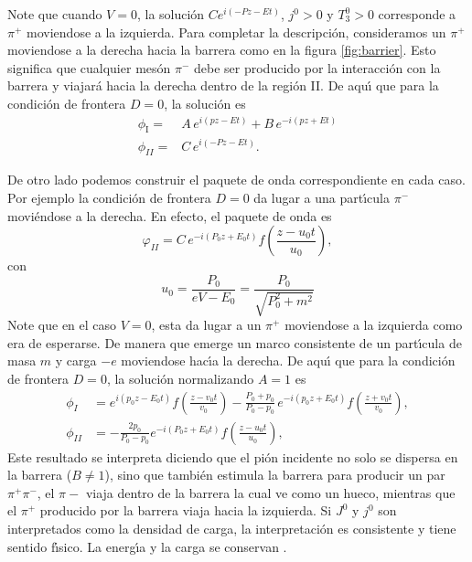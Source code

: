 Note que cuando $V=0$, la soluci\'on $C e^{i(-P z-E t)}$,  $j^0>0$ y $T^0_3>0$ corresponde a $\pi^+$ moviendose a la izquierda. Para completar la descripci\'on, consideramos un $\pi^+$ moviendose a la derecha hacia la barrera como en la figura \ref{fig:barrier}. Esto significa que cualquier mes\'on $\pi^-$ debe ser producido por la interacci\'on con la barrera y viajar\'a hacia la derecha dentro de la regi\'on II. De aqu\'\i{} que para la condici\'on de frontera $D=0$, la soluci\'on  es
\begin{align}
   \phi_{\text{I}}=&A\,e^{i(pz-Et)}+B\,e^{-i(pz+Et)}\nonumber\\
   \phi_{II}=&C\,e^{i(-Pz-Et)}.
\end{align}
 
De otro lado podemos  construir el paquete de onda correspondiente en cada caso. Por ejemplo la condici\'on de frontera $D=0$  da lugar  a una part\'\i cula $\pi^-$ movi\'endose a la derecha. En efecto, el paquete de onda es
\begin{equation}
  \varphi_{II}=C\,e^{-i(P_0z+E_0t)}f\left(\frac{z-u_0t}{u_0}\right),
\end{equation}
con
\begin{equation}
  u_0=\frac{P_0}{eV-E_0}=\frac{P_0}{\sqrt{P_0^2+m^2}}
\end{equation}
Note que en el caso $V=0$, esta da lugar a un $\pi^+$ moviendose a la izquierda como era de esperarse. De manera que emerge un marco consistente de un part\'\i cula de masa $m$ y carga $-e$ moviendose hac\'\i a la derecha.  De aqu\'\i{} que para la condici\'on de frontera $D=0$, la soluci\'on normalizando $A=1$ es \cite{Gross}
\begin{align}
  \phi_I&=e^{i(p_0z-E_0t)}f\left(\frac{z-v_0t}{v_0}\right)
  -\frac{P_0+p_0}{P_0-p_0}\,e^{-i(p_0z+E_0t)}f\left(\frac{z+v_0t}{v_0}\right),\nonumber\\
  \phi_{II}&=-\frac{2p_0}{P_0-p_0}e^{-i(P_0z+E_0t)}f\left(\frac{z-u_0t}{u_0}\right),
\end{align}
Este resultado se interpreta diciendo que el pi\'on incidente no solo se dispersa en la barrera ($B\neq1$), sino que tambi\'en estimula la barrera para producir un par $\pi^+\pi^-$, el $\pi-$ viaja dentro de la barrera la cual ve como un hueco, mientras que el $\pi^+$ producido por la barrera viaja hacia la izquierda. Si $J^0$ y $j^0$ son interpretados como la densidad de carga, la interpretaci\'on es consistente y tiene sentido f\'\i sico. La energ\'\i a y la carga se conservan \cite{Gross}. 


